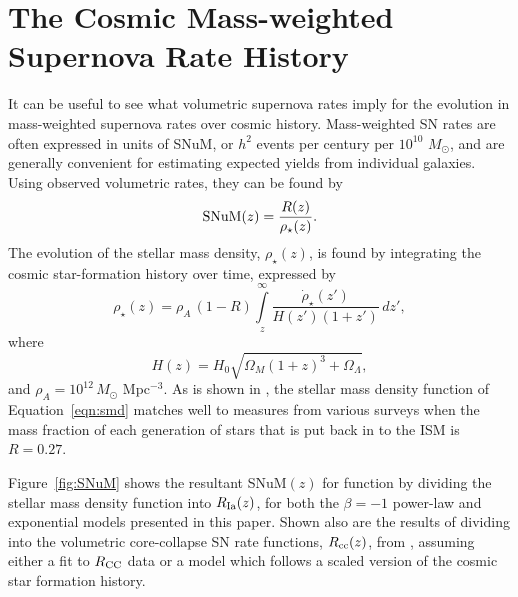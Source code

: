 \documentclass[apj, twocolumn]{aastex62}
\begin{document}

\section{The Cosmic Mass-weighted Supernova Rate History}\label{sec:snum}
It can be useful to see what volumetric supernova rates imply for the evolution in mass-weighted supernova rates over cosmic history. Mass-weighted SN rates are often expressed in units of SNuM, or $h^2$ events per century per $10^{10}$ $M_{\odot}$, and are generally convenient for estimating expected yields from individual galaxies. Using observed volumetric rates, they can be found by
\begin{equation}
	{\rm SNuM}(z) = \frac{R(z)}{{\rho}_{\star}(z)}.
\end{equation}
\noindent The evolution of the stellar mass density, ${\rho}_{\star}(z)$, is found by integrating the cosmic star-formation history over time, expressed by
\begin{equation}
	\rho_{\star}(z)=\rho_A\,(1-R) \int\limits_z^{\infty}\frac{\dot{\rho}_{\star}(z')}{H(z')(1+z')}\,dz',
	\label{eqn:smd}
\end{equation}
\noindent where 
\begin{equation}
	H(z) = H_0\sqrt{\Omega_M(1+z)^3+\Omega_{\Lambda}},
\end{equation}
\noindent and $\rho_A=10^{12}\, M_{\odot}$ Mpc$^{-3}$. As is shown in \cite{Madau:2014fk}, the stellar mass density function of Equation~\ref{eqn:smd} matches well to measures from various surveys when the mass fraction of each generation of stars that is put back in to the ISM is $R=0.27$.  

Figure~\ref{fig:SNuM} shows the resultant SNuM$(z)$ for function by dividing the stellar mass density function into $R_{\rm Ia}(z)$, for both the $\beta=-1$ power-law and exponential models presented in this paper. Shown also are the results of dividing into the volumetric core-collapse SN rate functions, $R_{\rm cc}(z)$, from \cite{Strolger:2015aa}, assuming either a fit to $R_{\rm CC}$ data or a model which follows a scaled version of the cosmic star formation history. 
\end{document}
